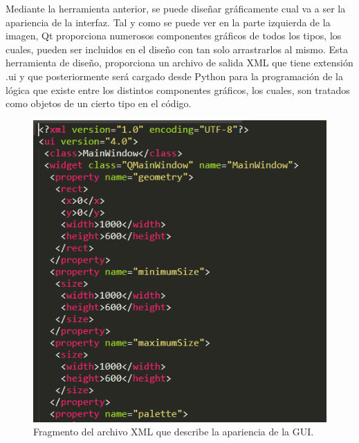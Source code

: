 Mediante la herramienta anterior, se puede diseñar gráficamente cual va a ser la apariencia de la interfaz. Tal y como se puede ver en la parte izquierda de la imagen, Qt proporciona numerosos componentes gráficos de todos los tipos, los cuales, pueden ser incluidos en el diseño con tan solo arrastrarlos al mismo. Esta herramienta de diseño, proporciona un archivo de salida XML que tiene extensión .ui y que posteriormente será cargado desde Python para la programación de la lógica que existe entre los distintos componentes gráficos, los cuales, son tratados como objetos de un cierto tipo en el código.

\begin{figure}[H]
    \centering
    \includegraphics[width=0.55\linewidth]{pictures/XmlGui.PNG}
    \caption{Fragmento del archivo XML que describe la apariencia de la GUI.}
    \label{fig:ui_XML}
\end{figure}

